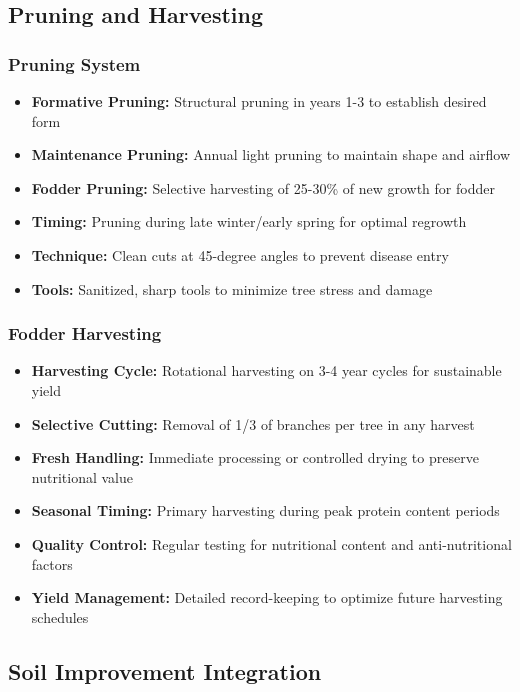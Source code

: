 \subsection{Pruning and Harvesting}

\subsubsection{Pruning System}
\begin{itemize}
    \item \textbf{Formative Pruning:} Structural pruning in years 1-3 to establish desired form
    \item \textbf{Maintenance Pruning:} Annual light pruning to maintain shape and airflow
    \item \textbf{Fodder Pruning:} Selective harvesting of 25-30\% of new growth for fodder
    \item \textbf{Timing:} Pruning during late winter/early spring for optimal regrowth
    \item \textbf{Technique:} Clean cuts at 45-degree angles to prevent disease entry
    \item \textbf{Tools:} Sanitized, sharp tools to minimize tree stress and damage
\end{itemize}

\subsubsection{Fodder Harvesting}
\begin{itemize}
    \item \textbf{Harvesting Cycle:} Rotational harvesting on 3-4 year cycles for sustainable yield
    \item \textbf{Selective Cutting:} Removal of 1/3 of branches per tree in any harvest
    \item \textbf{Fresh Handling:} Immediate processing or controlled drying to preserve nutritional value
    \item \textbf{Seasonal Timing:} Primary harvesting during peak protein content periods
    \item \textbf{Quality Control:} Regular testing for nutritional content and anti-nutritional factors
    \item \textbf{Yield Management:} Detailed record-keeping to optimize future harvesting schedules
\end{itemize}

\subsection{Soil Improvement Integration}

